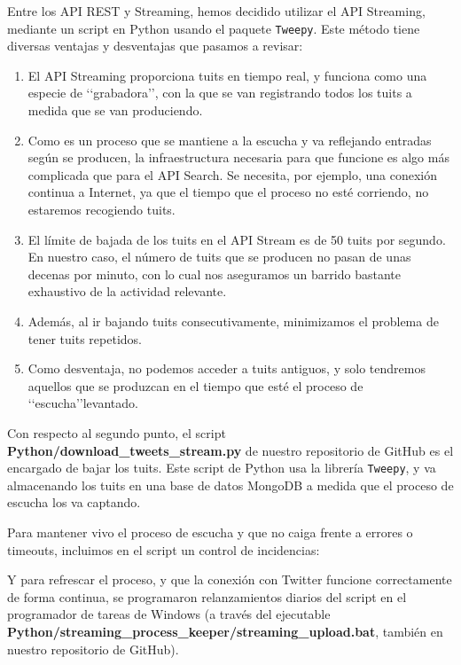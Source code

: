 Entre los API REST y Streaming, hemos decidido utilizar el API Streaming, mediante un script
en Python usando el paquete {\tt Tweepy}. Este método tiene diversas ventajas y desventajas que pasamos
a revisar:
\begin{enumerate}
\item El API Streaming proporciona tuits en tiempo real, y funciona como una especie de \lq\lq grabadora\rq\rq,
con la que se van registrando todos los tuits a medida que se van produciendo.
\item Como es un proceso que se mantiene a la escucha y va reflejando entradas según
se producen, la infraestructura necesaria para que funcione es algo  más complicada que para
el API Search. Se necesita, por ejemplo, una conexión continua a Internet, ya que el tiempo que
el proceso no esté corriendo, no estaremos recogiendo tuits.
\item El límite de bajada de los tuits en el API Stream es de 50 tuits por segundo.
En nuestro caso, el número de tuits que se producen no pasan de unas decenas por minuto, con
lo cual nos aseguramos un barrido bastante exhaustivo de la actividad relevante.
\item Además, al ir bajando tuits consecutivamente, minimizamos el problema de tener tuits repetidos.
\item Como desventaja, no podemos acceder a tuits antiguos, y solo tendremos aquellos que 
se produzcan en el tiempo que esté el proceso de \lq\lq escucha\rq\rq levantado.
\end{enumerate}

Con respecto al segundo punto,  el script
{\bf Python/download\_tweets\_stream.py} de nuestro repositorio de GitHub
es el encargado de bajar los tuits. Este script de Python usa la librería {\tt Tweepy}, y 
va almacenando los tuits en una base de datos MongoDB a medida que el proceso de escucha los
va captando. 


Para mantener vivo el proceso de escucha y que no caiga frente a errores o timeouts,
incluimos en el script un control de incidencias:


Y para refrescar el proceso, y que la conexión con Twitter funcione correctamente
de forma continua, se programaron relanzamientos diarios del script en el programador 
de tareas de Windows (a través del ejecutable 
{\bf Python/streaming\_process\_keeper/streaming\_upload.bat}, también en nuestro 
repositorio de GitHub).
 

